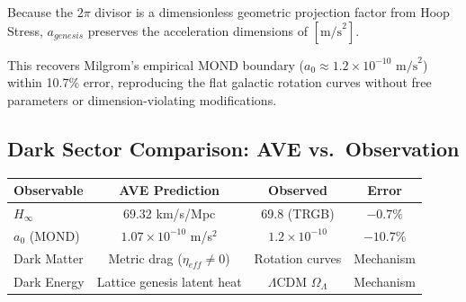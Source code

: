 Because the $2\pi$ divisor is a dimensionless geometric projection factor from Hoop Stress, $a_{genesis}$ preserves the acceleration dimensions of $[\text{m/s}^2]$.

This recovers Milgrom's empirical MOND boundary ($a_{0}\approx1.2\times10^{-10}\text{ m/s}^{2}$) within
10.7\% error, reproducing the flat galactic rotation curves without free parameters or dimension-violating modifications.

\subsection*{Dark Sector Comparison: AVE vs.\ Observation}
\begin{center}
\small
\renewcommand{\arraystretch}{1.2}
\begin{tabular}{lccc}
\toprule
\textbf{Observable} & \textbf{AVE Prediction} & \textbf{Observed} & \textbf{Error} \\
\midrule
$H_\infty$ & 69.32 km/s/Mpc & 69.8 (TRGB) & $-0.7\%$ \\
$a_0$ (MOND) & $1.07 \times 10^{-10}$ m/s$^2$ & $1.2 \times 10^{-10}$ & $-10.7\%$ \\
Dark Matter & Metric drag ($\eta_{eff} \neq 0$) & Rotation curves & Mechanism \\
Dark Energy & Lattice genesis latent heat & $\Lambda$CDM $\Omega_\Lambda$ & Mechanism \\
\bottomrule
\end{tabular}
\end{center}

